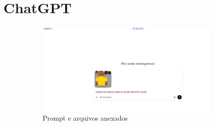 \FloatBarrier
\section{ChatGPT}
\label{s.chatGPTApendice}


\begin{figure}[htbp]
    \centering
    \caption{\small Processo da utilização 1 do chatGPT em julho/2025}
    \label{fig:chatGPT1}

    \begin{subfigure}{0.75\linewidth}
        \includegraphics[width=1\linewidth]{figs/chatGPT/visao_lateral/tela1_pixel.PNG}
        \caption{\small Prompt e arquivos anexados}
        \label{fig:chatGPT1a}
    \end{subfigure}
    \begin{subfigure}{0.2\linewidth}

\end{subfigure}
\end{figure}
